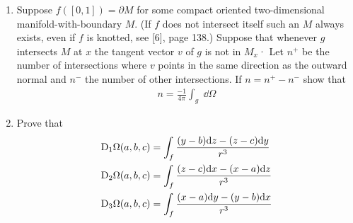 \begin{problems}
{\begin{enumerate}[label=(\alph*)]
                Let $(a',b',c')$ be a point on the same side of $M$ as the outward normal and $(a',b'c')$
                a point on the oppsite side. Show that by choosing $(a,b,c)$ sufficently close to $(a'.b',c')$ we can 
                make $\Omega(a,b,c)-\Omega(a',b',c')$ as close to $-4\pi$ as desired. \textit{Hint:} First 
                show that if $M=\partial N$ then $\Omega(a,b,c)=-4\pi$ for $(a,b,c)\in N-M$ and $\Omega(a,b,c)=0$
                for $(a,b,c)\notin N$.
            \item Suppose $f([0,1]) = \partial M$ for some compact oriented two-dimensional 
                manifold-with-boundary $M$. (If $f$ does not intersect itself such an $M$ always 
                exists, even if $f$ is knotted, see [6], page 138.) Suppose that whenever $g$ 
                intersects $M$ at $x$ the tangent vector $v$ of $g$ is not in $M_x$·
                Let $n^+$ be the number of intersections where $v$ points in the same direction as 
                the outward normal and $n^-$ the number of other intersections. If $n=n^+ - n^-$ show that
                \begin{align*}
                    n=\frac{-1}{4\pi}\int_{g}\;\dd\Omega
                \end{align*}
            \item Prove that 
                \begin{align*}
                    \mathrm{D}_{1}\Omega(a,b,c) & = \int_{f}\frac{(y-b)\mathrm{d} z-(z-c)\mathrm{d} y}{r^{3}} \\
                    \mathrm{D}_{2}\Omega(a,b,c) & = \int_{f}\frac{(z-c)\mathrm{d} x-(x-a)\mathrm{d} z}{r^{3}} \\
                    \mathrm{D}_{3}\Omega(a,b,c) & = \int_{f}\frac{(x-a)\mathrm{d} y-(y-b)\mathrm{d} x}{r^{3}}
                \end{align*}


\end{enumerate}}
\end{problems}
